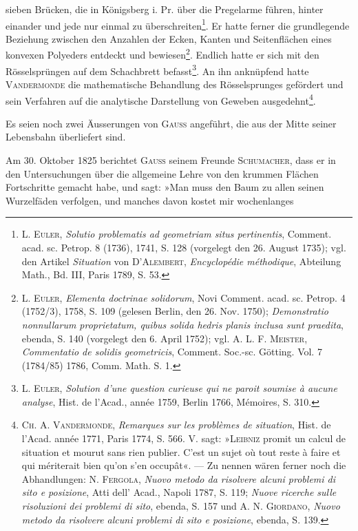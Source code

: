 sieben Brücken, die in Königsberg i. Pr. über die Pregelarme führen, hinter
einander und jede nur einmal zu überschreiten\footnote{L. \textsc{Euler}, \textit{Solutio problematis ad geometriam situs pertinentis}, Comment. acad. sc. Petrop. 8 (1736), 1741, S. 128 (vorgelegt den 26. August 1735); vgl. den Artikel \textit{Situation} von \textsc{D’Alembert}, \textit{Encyclopédie méthodique}, Abteilung Math., Bd. III, Paris 1789, S. 53.}. Er hatte ferner die grundlegende
Beziehung zwischen den Anzahlen der Ecken, Kanten und Seitenflächen
eines konvexen Polyeders entdeckt und bewiesen\footnote{L. \textsc{Euler}, \textit{Elementa doctrinae solidorum}, Novi Comment. acad. sc. Petrop. 4 (1752/3), 1758, S. 109 (gelesen Berlin, den 26. Nov. 1750); \textit{Demonstratio nonnullarum proprietatum, quibus solida hedris planis inclusa sunt praedita}, ebenda, S. 140 (vorgelegt den 6. April 1752); vgl. A. L. F. \textsc{Meister}, \textit{Commentatio de solidis geometricis}, Comment. Soc.-sc. Götting. Vol. 7 (1784/85) 1786, Comm. Math. S. 1.}. Endlich hatte er
sich mit den Rösselsprüngen auf dem Schachbrett befasst\footnote{L. \textsc{Euler}, \textit{Solution d’une question curieuse qui ne paroit soumise à aucune analyse}, Hist. de l’Acad., année 1759, Berlin 1766, Mémoires, S. 310.}. An ihn anknüpfend
hatte \textsc{Vandermonde} die mathematische Behandlung des Rösselsprunges gefördert
und sein Verfahren auf die analytische Darstellung von Geweben ausgedehnt\footnote{\textsc{Ch. A. Vandermonde}, \textit{Remarques sur les problèmes de situation}, Hist. de l’Acad. année 1771, Paris 1774, S. 566. V. sagt: »\textsc{Leibniz} promit un calcul de situation et mourut sans rien publier. C’est un sujet où tout reste à faire et qui mériterait bien qu’on s’en occupât«. — Zu nennen wären ferner noch die Abhandlungen: N. \textsc{Fergola}, \textit{Nuovo metodo da risolvere alcuni problemi di sito e posizione}, Atti dell’ Acad., Napoli 1787, S. 119; \textit{Nuove ricerche sulle risoluzioni dei problemi di sito}, ebenda, S. 157 und A. N. \textsc{Giordano}, \textit{Nuovo metodo da risolvere alcuni problemi di sito e posizione}, ebenda, S. 139.}.
\par
Es seien noch zwei Äusserungen von \textsc{Gauss} angeführt, die aus der Mitte
seiner Lebensbahn überliefert sind.
\par
Am 30. Oktober 1825 berichtet \textsc{Gauss} seinem Freunde \textsc{Schumacher}, dass
er in den Untersuchungen über die allgemeine Lehre von den krummen
Flächen Fortschritte gemacht habe, und sagt: »Man muss den Baum zu allen
seinen Wurzelfäden verfolgen, und manches davon kostet mir wochenlanges
